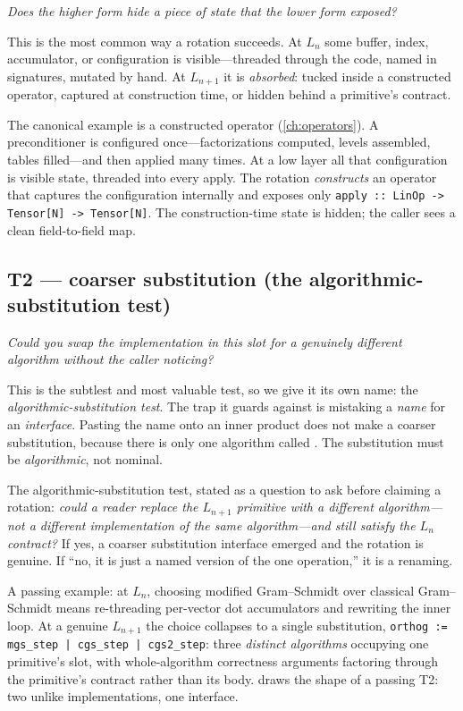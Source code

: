 \emph{Does the higher form hide a piece of state that the lower form exposed?}

This is the most common way a rotation succeeds. At $L_n$ some buffer, index,
accumulator, or configuration is visible---threaded through the code, named in
signatures, mutated by hand. At $L_{n+1}$ it is \emph{absorbed}: tucked inside a
constructed operator, captured at construction time, or hidden behind a
primitive's contract.

The canonical example is a constructed operator (\cref{ch:operators}). A
preconditioner is configured once---factorizations computed, levels assembled,
tables filled---and then applied many times. At a low layer all that
configuration is visible state, threaded into every apply. The rotation
\emph{constructs} an operator that captures the configuration internally and
exposes only \lstinline[style=l4style]|apply :: LinOp -> Tensor[N] -> Tensor[N]|.
The construction-time state is hidden; the caller sees a clean field-to-field map.

\subsection{T2 --- coarser substitution (the algorithmic-substitution test)}

\emph{Could you swap the implementation in this slot for a genuinely different
algorithm without the caller noticing?}

This is the subtlest and most valuable test, so we give it its own name: the
\emph{algorithmic-substitution test}. The trap it guards against is mistaking a
\emph{name} for an \emph{interface}. Pasting the name  onto an inner
product does not make a coarser substitution, because there is only one algorithm
called . The substitution must be \emph{algorithmic}, not nominal.

\begin{notationbox}
The algorithmic-substitution test, stated as a question to ask before claiming a
rotation: \emph{could a reader replace the $L_{n+1}$ primitive with a different
algorithm---not a different implementation of the same algorithm---and still
satisfy the $L_n$ contract?} If yes, a coarser substitution interface emerged and
the rotation is genuine. If ``no, it is just a named version of the one
operation,'' it is a renaming.
\end{notationbox}

A passing example: at $L_n$, choosing modified Gram--Schmidt over classical
Gram--Schmidt means re-threading per-vector dot accumulators and rewriting the
inner loop. At a genuine $L_{n+1}$ the choice collapses to a single substitution,
\lstinline[style=l4style]@orthog := mgs_step | cgs_step | cgs2_step@: three
\emph{distinct algorithms} occupying one primitive's slot, with whole-algorithm
correctness arguments factoring through the primitive's contract rather than its
body.  draws the shape of a passing T2: two unlike
implementations, one interface.

